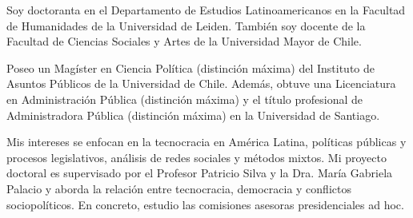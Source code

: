 




\par{Soy doctoranta en el Departamento de Estudios Latinoamericanos en la Facultad de Humanidades de la Universidad de Leiden. También soy docente de la Facultad de Ciencias Sociales y Artes de la Universidad Mayor de Chile. 

Poseo un Magíster en Ciencia Política (distinción máxima) del Instituto de Asuntos Públicos de la Universidad de Chile. Además, obtuve una Licenciatura en Administración Pública (distinción máxima) y el título profesional de Administradora Pública (distinción máxima) en la Universidad de Santiago.

Mis intereses se enfocan en la tecnocracia en América Latina, políticas públicas y procesos legislativos, análisis de redes sociales y métodos mixtos. Mi proyecto doctoral es supervisado por el Profesor Patricio Silva y la Dra. María Gabriela Palacio y aborda la relación entre tecnocracia, democracia y conflictos sociopolíticos. En concreto, estudio las comisiones asesoras presidenciales ad hoc.}\\